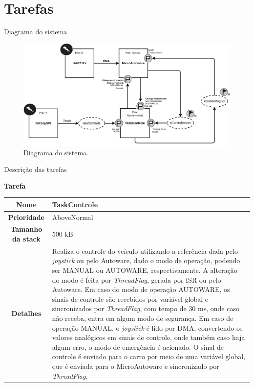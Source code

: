 \documentclass{if-beamer}
\begin{document}
\section{Tarefas}



\begin{frame}{Diagrama do sistema}
	
	\begin{figure}
		\centering
		\includegraphics[width = \textwidth]{img/system_diagram}
		\caption{Diagrama do sistema.}
		\label{fig:systemdiagram}
	\end{figure}
	
\end{frame}



\begin{frame}{Descrição das tarefas}
	
\begin{block}{\textbf{Tarefa}}
	
	\centering
	
	\begin{tabular}{c|p{8cm}}
		\textbf{Nome} & TaskControle \\
		\hline
		\textbf{Prioridade}& AboveNormal \\
		\hline
		\textbf{Tamanho da stack} & 500 kB \\
		\hline
		\textbf{Detalhes} & Realiza o controle do veículo utilizando a referência dada pelo \textit{joystick} ou pelo Autoware, dado o modo de operação, podendo ser MANUAL ou AUTOWARE, respectivamente. A alteração do modo é feita por \textit{ThreadFlag}, gerada por ISR ou pelo Autoware. Em caso do modo de operação AUTOWARE, os sinais de controle são recebidos por variável global e sincronizados por \textit{ThreadFlag}, com tempo de 30 ms, onde caso não receba, entra em algum modo de segurança. Em caso de operação MANUAL,  o \textit{joystick} é lido por DMA, convertendo os valores analógicos em sinais de controle, onde também caso haja algum erro, o modo de emergência é acionado. O sinal de controle é enviado para o carro por meio de uma variável global, que é enviada para o MicroAutoware e sincronizado por \textit{ThreadFlag}. \\
	\end{tabular}
	
\end{block}	
	
\end{frame}
\end{document}
